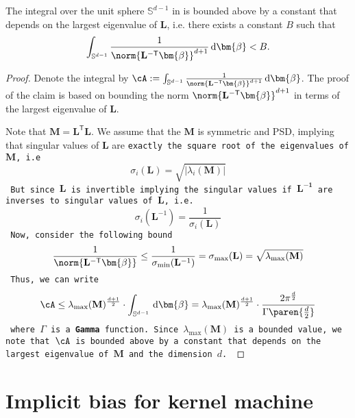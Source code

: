 \begin{lemma}
    The integral over the unit sphere $\mathbb{S}^{d-1}$ in  is bounded above by a constant that depends on the largest eigenvalue of $\mathbf{L}$, i.e. there exists a constant $B$ such that
    \begin{align*}
        \int_{\mathbb{S}^{d-1}} \frac{1}{{\norm{\mathbf{L}^{-\mathsf{T}}\bm{\beta}}^{d+1}}} \,\mathrm{d}\bm{\beta} < B.
    \end{align*}
\end{lemma}
\begin{proof}
Denote the integral by $\cA:= \int_{\mathbb{S}^{d-1}} \frac{1}{{\norm{\mathbf{L}^{-\mathsf{T}}\bm{\beta}}^{d+1}}} \,\mathrm{d}\bm{\beta}$.
    The proof of the claim is based on bounding the norm $\norm{\mathbf{L}^{-\mathsf{T}}\bm{\beta}}^{d+1}$ in terms of the largest eigenvalue of $\mathbf{L}$.

    Note that $\mathbf{M} = \mathbf{L}^\mathsf{T}\mathbf{L}$. We assume that the $\mathbf{M}$ is symmetric and PSD, implying that singular values of $\mathbf{L}$ are \tt{exactly} the square root of the eigenvalues of $\mathbf{M}$, i.e
    \[ \sigma_i(\mathbf{L}) = \sqrt{|\lambda_i(\mathbf{M})|}\]
    But since $\mathbf{L}$ is invertible implying the singular values if $\mathbf{L^{-1}}$ are inverses to singular values of $\mathbf{L}$, i.e.
    \[
    \sigma_i(\mathbf{L}^{-1}) = \frac{1}{\sigma_i(\mathbf{L})}
    \]
    Now, consider the following bound
    \begin{align*}
        \frac{1}{\norm{\mathbf{L}^{-\mathsf{T}}\bm{\beta}}} \le \frac{1}{\sigma_{\min}(\mathbf{L}^{-1})} = \sigma_{\max}(\mathbf{L}) = \sqrt{\lambda_{\max}(\mathbf{M})}
    \end{align*}
    Thus, we can write 
    \[
    \cA \le \lambda_{\max}(\mathbf{M})^{\frac{d+1}{2}} \cdot \int_{\mathbb{S}^{d-1}} \,\mathrm{d}\bm{\beta} = \lambda_{\max}(\mathbf{M})^{\frac{d+1}{2}} \cdot\frac{2\pi^{\frac{d}{2}}}{\Gamma\paren{\frac{d}{2}}}
    \]
    where $\Gamma$ is a \textbf{Gamma} function.
    Since $\lambda_{\max}(\mathbf{M})$ is a bounded value, we note that $\cA$ is bounded above by a constant that depends on the largest eigenvalue of $\mathbf{M}$ and the dimension $d$.
    \end{proof}

    \section{Implicit bias for kernel machine}


